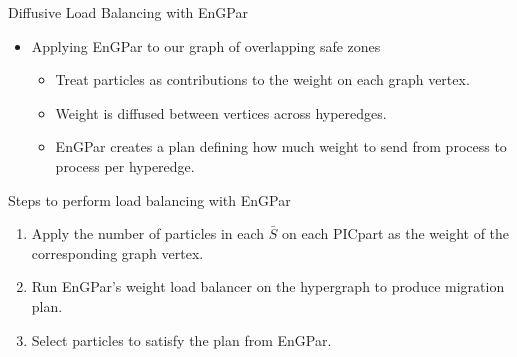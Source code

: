 \documentclass[aspectratio=169]{beamer}
\begin{document}
\begin{frame}{Diffusive Load Balancing with EnGPar}
  \begin{itemize}
  \item Applying EnGPar to our graph of overlapping safe zones
    \begin{itemize}
    \item Treat particles as contributions to the weight on each graph vertex.
    \item Weight is diffused between vertices across hyperedges.
    \item EnGPar creates a plan defining how much weight to send from process to process per hyperedge.
    \end{itemize}
  \end{itemize}
  Steps to perform load balancing with EnGPar
  \begin{enumerate}
  \item Apply the number of particles in each $\bar{S}$ on each PICpart as the weight of the corresponding graph vertex.
  \item Run EnGPar's weight load balancer on the hypergraph to produce migration plan.
  \item Select particles to satisfy the plan from EnGPar.
  \end{enumerate}
\end{frame}
\end{document}

